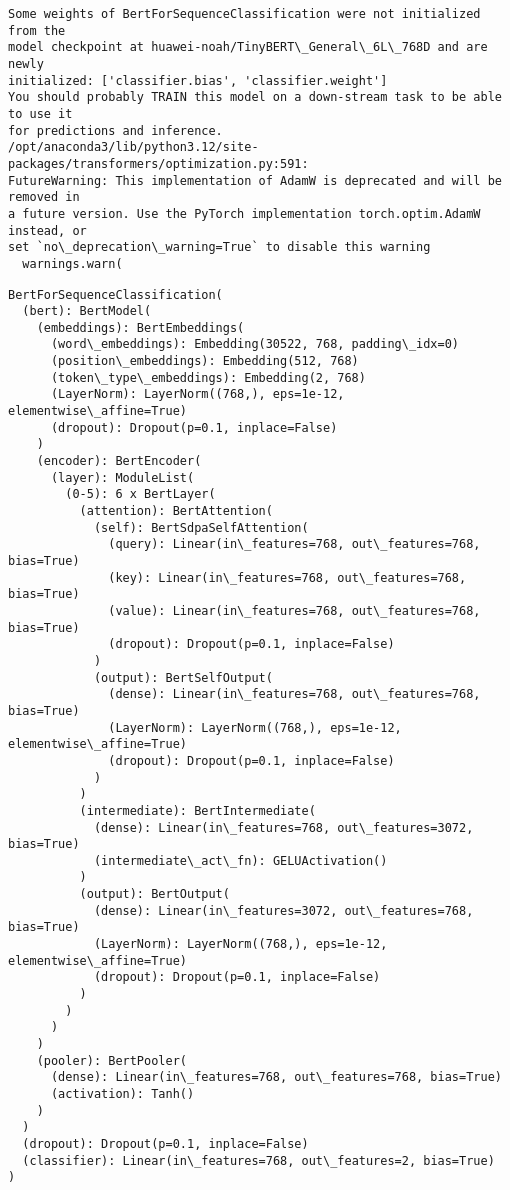 \documentclass[11pt]{article}
\makeatletter
\newcommand{\boxspacing}{\kern\kvtcb@left@rule\kern\kvtcb@boxsep}
\newcommand{\prompt}[4]{
        {\ttfamily\llap{{\color{#2}[#3]:\hspace{3pt}#4}}\vspace{-\baselineskip}}
    }
\makeatother
\begin{document}
    \begin{Verbatim}[commandchars=\\\{\}]
Some weights of BertForSequenceClassification were not initialized from the
model checkpoint at huawei-noah/TinyBERT\_General\_6L\_768D and are newly
initialized: ['classifier.bias', 'classifier.weight']
You should probably TRAIN this model on a down-stream task to be able to use it
for predictions and inference.
/opt/anaconda3/lib/python3.12/site-packages/transformers/optimization.py:591:
FutureWarning: This implementation of AdamW is deprecated and will be removed in
a future version. Use the PyTorch implementation torch.optim.AdamW instead, or
set `no\_deprecation\_warning=True` to disable this warning
  warnings.warn(
    \end{Verbatim}

            \begin{tcolorbox}[breakable, size=fbox, boxrule=.5pt, pad at break*=1mm, opacityfill=0]
\prompt{Out}{outcolor}{12}{\boxspacing}
\begin{Verbatim}[commandchars=\\\{\}]
BertForSequenceClassification(
  (bert): BertModel(
    (embeddings): BertEmbeddings(
      (word\_embeddings): Embedding(30522, 768, padding\_idx=0)
      (position\_embeddings): Embedding(512, 768)
      (token\_type\_embeddings): Embedding(2, 768)
      (LayerNorm): LayerNorm((768,), eps=1e-12, elementwise\_affine=True)
      (dropout): Dropout(p=0.1, inplace=False)
    )
    (encoder): BertEncoder(
      (layer): ModuleList(
        (0-5): 6 x BertLayer(
          (attention): BertAttention(
            (self): BertSdpaSelfAttention(
              (query): Linear(in\_features=768, out\_features=768, bias=True)
              (key): Linear(in\_features=768, out\_features=768, bias=True)
              (value): Linear(in\_features=768, out\_features=768, bias=True)
              (dropout): Dropout(p=0.1, inplace=False)
            )
            (output): BertSelfOutput(
              (dense): Linear(in\_features=768, out\_features=768, bias=True)
              (LayerNorm): LayerNorm((768,), eps=1e-12, elementwise\_affine=True)
              (dropout): Dropout(p=0.1, inplace=False)
            )
          )
          (intermediate): BertIntermediate(
            (dense): Linear(in\_features=768, out\_features=3072, bias=True)
            (intermediate\_act\_fn): GELUActivation()
          )
          (output): BertOutput(
            (dense): Linear(in\_features=3072, out\_features=768, bias=True)
            (LayerNorm): LayerNorm((768,), eps=1e-12, elementwise\_affine=True)
            (dropout): Dropout(p=0.1, inplace=False)
          )
        )
      )
    )
    (pooler): BertPooler(
      (dense): Linear(in\_features=768, out\_features=768, bias=True)
      (activation): Tanh()
    )
  )
  (dropout): Dropout(p=0.1, inplace=False)
  (classifier): Linear(in\_features=768, out\_features=2, bias=True)
)
\end{Verbatim}
\end{tcolorbox}
        
\end{document}
